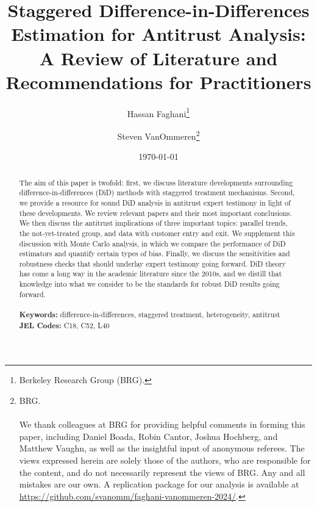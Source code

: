 \documentclass[12pt]{article}
\begin{document}
\begin{titlepage}
\title{Staggered Difference-in-Differences Estimation for Antitrust Analysis: A Review of Literature and Recommendations for Practitioners}
\author{Hassan Faghani\thanks{Berkeley Research Group (BRG).} \and Steven VanOmmeren\thanks{
BRG. \\\\ We thank colleagues at BRG for providing helpful comments in forming this paper, including Daniel Boada, Robin Cantor, Joshua Hochberg, and Matthew Vaughn, as well as the insightful input of anonymous referees. The views expressed herein are solely those of the authors, who are responsible for the content, and do not necessarily represent the views of BRG. Any and all mistakes are our own. A replication package for our analysis is available at \url{https://github.com/svanomm/faghani-vanommeren-2024/}.
}
}

\date{\today}
\maketitle
\begin{abstract}
\noindent 
The aim of this paper is twofold: first, we discuss literature developments surrounding difference-in-differences (DiD) methods with staggered treatment mechanisms. Second, we provide a resource for sound DiD analysis in antitrust expert testimony in light of these developments. We review relevant papers and their most important conclusions. We then discuss the antitrust implications of three important topics: parallel trends, the not-yet-treated group, and data with customer entry and exit. We supplement this discussion with Monte Carlo analysis, in which we compare the performance of DiD estimators and quantify certain types of bias. Finally, we discuss the sensitivities and robustness checks that should underlay expert testimony going forward. DiD theory has come a long way in the academic literature since the 2010s, and we distill that knowledge into what we consider to be the standards for robust DiD results going forward.\\
\vspace{0in}\\
\noindent\textbf{Keywords:} difference-in-differences, staggered treatment, heterogeneity, antitrust
\vspace{0in}\\
\noindent\textbf{JEL Codes:} C18, C52, L40\\

\bigskip
\end{abstract}
\setcounter{page}{0}
\thispagestyle{empty}
\end{titlepage}
\pagebreak \newpage
\end{document}
